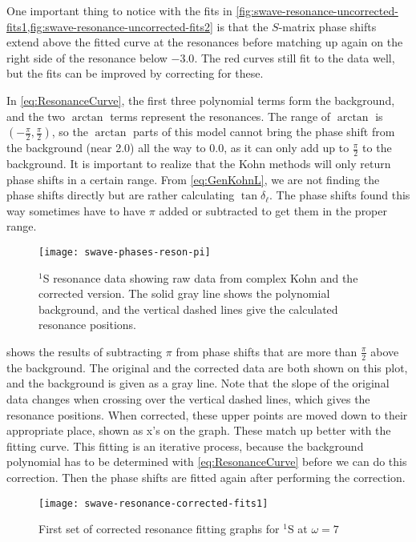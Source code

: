 \documentclass[Dissertation.tex]{subfiles}
\begin{document}
One important thing to notice with the fits in
\cref{fig:swave-resonance-uncorrected-fits1,fig:swave-resonance-uncorrected-fits2} is that the
$S$-matrix phase shifts extend above the fitted curve at the resonances before 
matching up again on the right side of the resonance below $-3.0$. The red 
curves still fit to the data well, but the fits can be improved by correcting 
for these. 

In \cref{eq:ResonanceCurve}, the first three polynomial terms form the 
background, and the two $\arctan$ terms represent the resonances. The range 
of $\arctan$ is $(-\frac{\pi}{2},\frac{\pi}{2})$, so the $\arctan$ parts of 
this model cannot bring the phase shift from the background (near 2.0) all 
the way to 0.0, as it can only add up to $\frac{\pi}{2}$ to the background. 
It is important to realize that the Kohn methods will only return phase 
shifts in a certain range. From \cref{eq:GenKohnL}, we are not finding the 
phase shifts directly but are rather calculating $\tan \delta_\ell$. The 
phase shifts found this way sometimes have to have $\pi$ added or subtracted 
to get them in the proper range.

\begin{figure}[H]
	\centering
	\texttt{[image: swave-phases-reson-pi]}
	\caption[$^1$S resonance data showing correction]{$^1$S resonance data showing raw data from complex Kohn and the corrected version. The solid gray line shows the polynomial background, and the vertical dashed lines give the calculated resonance positions.}
	\label{fig:swave-phases-reson-pi}
\end{figure}

 shows the results of subtracting $\pi$ from 
phase shifts that are more than $\frac{\pi}{2}$ above the background. The 
original and the corrected data are both shown on this plot, and the 
background is given as a gray line. Note that the slope of the original data 
changes when crossing over the vertical dashed lines, which gives the 
resonance positions. When corrected, these upper points are moved down to 
their appropriate place, shown as x's on the graph. These match up better 
with the fitting curve. This fitting is an iterative process, because the 
background polynomial has to be determined with \cref{eq:ResonanceCurve} 
before we can do this correction. Then the phase shifts are fitted again 
after performing the correction.

\begin{figure}[H]
	\centering
	\texttt{[image: swave-resonance-corrected-fits1]}
	\caption{First set of corrected resonance fitting graphs for $^1$S at $\omega = 7$}
	\label{fig:swave-resonance-corrected-fits1}
\end{figure}
\end{document}
